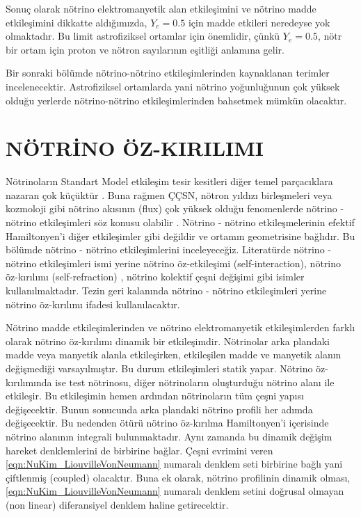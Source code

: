 Sonuç olarak nötrino elektromanyetik alan etkileşimini ve nötrino madde etkileşimini dikkatte aldığımızda, $ Y_{e}=0.5 $ için madde etkileri neredeyse yok olmaktadır. Bu limit astrofiziksel ortamlar için önemlidir, çünkü $ Y_{e}=0.5 $, nötr bir ortam için proton ve nötron sayılarının eşitliği anlamına gelir.

Bir sonraki bölümde nötrino-nötrino etkileşimlerinden kaynaklanan terimler incelenecektir. Astrofiziksel ortamlarda yani nötrino yoğunluğunun çok yüksek olduğu yerlerde nötrino-nötrino etkileşimlerinden bahsetmek mümkün olacaktır.

\section{NÖTRİNO ÖZ-KIRILIMI}\label{sec:notrinoOzKirilimi} %

Nötrinoların Standart Model etkileşim tesir kesitleri diğer temel parçacıklara nazaran çok küçüktür \cite{Formaggio:2012cpf}. Buna rağmen ÇÇSN, nötron yıldızı birleşmeleri veya kozmoloji gibi nötrino akısının (flux) çok yüksek olduğu fenomenlerde nötrino - nötrino etkileşimleri söz konusu olabilir \cite{Berryman:2022hds}. Nötrino - nötrino etkileşmelerinin efektif Hamiltonyen'i diğer etkileşimler gibi değildir ve ortamın geometrisine bağlıdır. Bu bölümde nötrino - nötrino etkileşimlerini inceleyeceğiz. Literatürde nötrino - nötrino etkileşimleri ismi yerine nötrino öz-etkileşimi \cite{Berryman:2022hds} (self-interaction), nötrino öz-kırılımı (self-refraction) \cite{Pehlivan:2010zz,Friedland:2010sc}, nötrino kolektif çeşni değişimi \cite{Chakraborty:2016yeg} gibi isimler kullanılmaktadır. Tezin geri kalanında nötrino - nötrino etkileşimleri yerine nötrino öz-kırılımı ifadesi kullanılacaktır.

Nötrino madde etkileşimlerinden ve nötrino elektromanyetik etkileşimlerden farklı olarak nötrino öz-kırılımı dinamik bir etkileşimdir. Nötrinolar arka plandaki madde veya manyetik alanla etkileşirken, etkileşilen madde ve manyetik alanın değişmediği varsayılmıştır. Bu durum etkileşimleri statik yapar. Nötrino öz-kırılımında ise test nötrinosu, diğer nötrinoların oluşturduğu nötrino alanı ile etkileşir. Bu etkileşimin hemen ardından nötrinoların tüm çeşni yapısı değişecektir. Bunun sonucunda arka plandaki nötrino profili her adımda değişecektir. Bu nedenden ötürü nötrino öz-kırılma Hamiltonyen'i içerisinde nötrino alanının integrali bulunmaktadır. Aynı zamanda bu dinamik değişim hareket denklemlerini de birbirine bağlar. Çeşni evrimini veren \eqref{eqn:NuKim_LiouvilleVonNeumann} numaralı denklem seti birbirine bağlı yani çiftlenmiş (coupled) olacaktır. Buna ek olarak, nötrino profilinin dinamik olması, \eqref{eqn:NuKim_LiouvilleVonNeumann} numaralı denklem setini doğrusal olmayan (non linear) diferansiyel denklem haline getirecektir.

